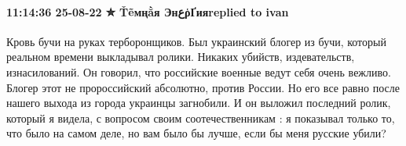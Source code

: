  
 
 
 
 

\paragraph{11:14:36 25-08-22 ✮ Ťẽмңằя ЭнعῥҐияreplied to ivan}

Кровь бучи на руках терборонщиков.
Был украинский блогер из бучи, который реальном времени выкладывал ролики. Никаких убийств, издевательств, изнасилований. Он говорил, что российские военные ведут себя очень вежливо. Блогер этот не пророссийский абсолютно, против России. Но его все равно после нашего выхода из города украинцы загнобили. И он выложил последний ролик, который я видела, с вопросом своим соотечественникам : я показывал только то, что было на самом деле, но вам было бы лучше, если бы меня русские убили?
